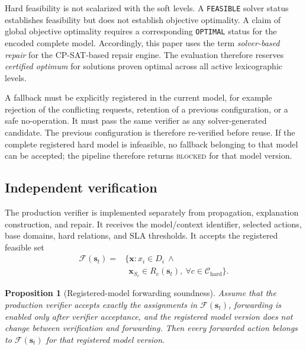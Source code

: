 \documentclass[pdflatex,sn-mathphys-num,iicol,oneside]{sn-jnl}
\newcommand{\cpsat}{\textsc{CP-SAT}\xspace}
\newtheorem{proposition}{Proposition}
\begin{document}
Hard feasibility is not scalarized with the soft levels. A
\texttt{FEASIBLE} solver status establishes feasibility but does not
establish objective optimality. A claim of global objective
optimality requires a corresponding \texttt{OPTIMAL} status for the
encoded complete model. Accordingly, this paper uses
the term \emph{solver-based repair} for the \cpsat-based repair
engine. The evaluation therefore reserves \emph{certified optimum}
for solutions proven optimal across all active lexicographic levels.

A fallback must be explicitly registered in the current model, for
example rejection of the conflicting requests, retention of a
previous configuration, or a safe no-operation. It must pass the same
verifier as any solver-generated candidate. The previous
configuration is therefore re-verified before reuse. If the complete
registered hard model is infeasible, no fallback belonging to that
model can be accepted; the pipeline therefore returns
\textsc{blocked} for that model version.

\subsection{Independent verification}
\label{sec:verifier}

The production verifier is implemented separately from propagation,
explanation construction, and repair. It receives the model/context
identifier, selected actions, base domains, hard relations, and SLA
thresholds. It accepts the registered feasible set
\begin{equation}
\begin{split}
\mathcal{F}(\bm{s}_t)
={}&
\bigl\{
\bm{x}:
x_i\in D_i
\ \land\\
&\ \
\bm{x}_{S_c}\in R_c(\bm{s}_t),
\
\forall c\in\mathcal{C}_{\mathrm{hard}}
\bigr\}.
\end{split}
\label{eq:feasible-set}
\end{equation}

\begin{proposition}[Registered-model forwarding soundness]
\label{prop:soundness}
Assume that the production verifier accepts exactly the assignments in
$\mathcal{F}(\bm{s}_t)$, forwarding is enabled only after verifier
acceptance, and the registered model version does not change between
verification and forwarding. Then every forwarded action belongs to
$\mathcal{F}(\bm{s}_t)$ for that registered model version.
\end{proposition}
\end{document}
